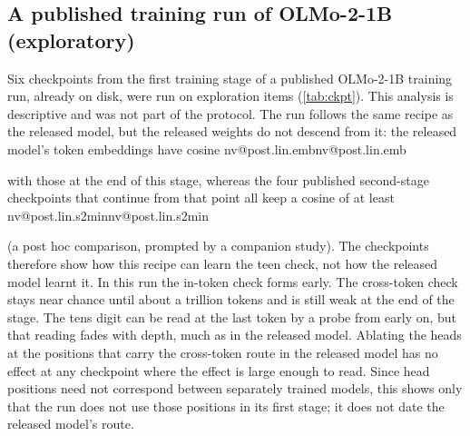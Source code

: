 \documentclass[11pt]{article}
\makeatletter
\newcommand{\nv}[1]{\ifcsname nv@#1\endcsname\csname nv@#1\endcsname\else\PackageError{numbers}{Unknown number key #1}{}\fi}
\newcommand{\ol}{OLMo-2-1B}
\makeatother
\begin{document}
\subsection{A published training run of \ol{} (exploratory)}

Six checkpoints from the first training stage of a published \ol{} training run, already on disk, were run on exploration items (\cref{tab:ckpt}). This analysis is descriptive and was not part of the protocol. The run follows the same recipe as the released model, but the released weights do not descend from it: the released model's token embeddings have cosine \nv{post.lin.emb} with those at the end of this stage, whereas the four published second-stage checkpoints that continue from that point all keep a cosine of at least \nv{post.lin.s2min} (a post hoc comparison, prompted by a companion study). The checkpoints therefore show how this recipe can learn the teen check, not how the released model learnt it. In this run the in-token check forms early. The cross-token check stays near chance until about a trillion tokens and is still weak at the end of the stage. The tens digit can be read at the last token by a probe from early on, but that reading fades with depth, much as in the released model. Ablating the heads at the positions that carry the cross-token route in the released model has no effect at any checkpoint where the effect is large enough to read. Since head positions need not correspond between separately trained models, this shows only that the run does not use those positions in its first stage; it does not date the released model's route.
\end{document}
